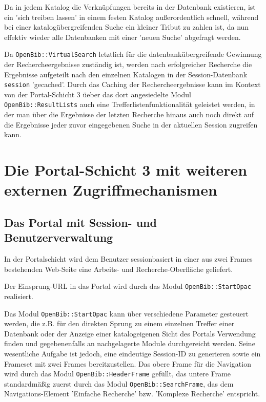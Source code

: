 \documentclass[11pt, twoside, a4paper, BCOR8mm, DIV12, bibtotoc,idxtotoc]{scrbook}
\begin{document}
Da in jedem Katalog die Verknüpfungen bereits in der Datenbank
existieren, ist ein 'sich treiben lassen' in einem festen Katalog
außer\-ordentlich schnell, während bei einer katalogübergreifenden
Suche ein kleiner Tribut zu zahlen ist, da nun effektiv wieder alle
Datenbanken mit einer 'neuen Suche' abgefragt werden.

Da \texttt{OpenBib::VirtualSearch} letztlich für die
datenbankübergreifende Gewinnung der Recherche\-er\-geb\-nisse
zuständig ist, werden nach erfolgreicher Recherche die Ergebnisse
aufgeteilt nach den einzelnen Katalogen in der Session-Datenbank
\texttt{session} 'gecached'. Durch das Caching der
Re\-cher\-che\-ergebnisse kann im Kontext von der Portal-Schicht 3
üeber das dort angesiedelte Modul \texttt{OpenBib::ResultLists} auch
eine Trefferlistenfunktionalität geleistet werden, in der man über
die Ergebnisse der letzten Recherche hinaus auch noch direkt auf die
Ergebnisse jeder zuvor eingegebenen Suche in der aktuellen Session
zugreifen kann.

\section{Die Portal-Schicht 3 mit weiteren externen Zugriffmechanismen}

\subsection{Das Portal mit Session- und Benutzerverwaltung}

In der Portalschicht wird dem Benutzer sessionbasiert in einer aus
zwei Frames bestehenden Web-Seite eine Arbeits- und Recherche-Oberfläche
geliefert. 

Der Einsprung-URL in das Portal wird durch das Modul
\texttt{OpenBib::StartOpac} realisiert.

Das Modul \texttt{OpenBib::StartOpac} kann über verschiedene
Parameter gesteuert werden, die z.B. für den direkten Sprung zu einem
einzelnen Treffer einer Datenbank oder der Anzeige einer
katalogeigenen Sicht des Portals Verwendung finden und gegebenenfalls
an nachgelagerte Module durchgereicht werden. Seine wesentliche
Aufgabe ist jedoch, eine eindeutige Session-ID zu generieren sowie ein
Frameset mit zwei Frames bereitzustellen.  Das obere Frame für die
Navigation wird durch das Modul \texttt{OpenBib::HeaderFrame}
gefüllt, das untere Frame standardmäßig zuerst durch das Modul
\texttt{OpenBib::SearchFrame}, das dem Navigations-Element 'Einfache
Recherche' bzw. 'Komplexe Recherche' entspricht.
\end{document}
